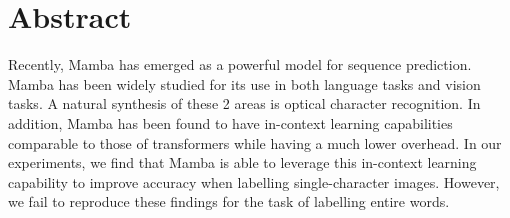 \section{Abstract}
Recently, Mamba has emerged as a powerful model for sequence prediction.
Mamba has been widely studied for its use in both language
tasks\cite{mamba, mambalang} and vision tasks\cite{medmamb, vmamba}.
A natural synthesis of these 2 areas is optical character recognition.
In addition, Mamba has been found to have in-context learning capabilities
comparable to those of transformers while having a much lower
overhead\cite{mambaicl}.
In our experiments, we find that Mamba is able to leverage this in-context
learning capability to improve accuracy when labelling single-character images.
However, we fail to reproduce these findings for the task of labelling entire
words.
